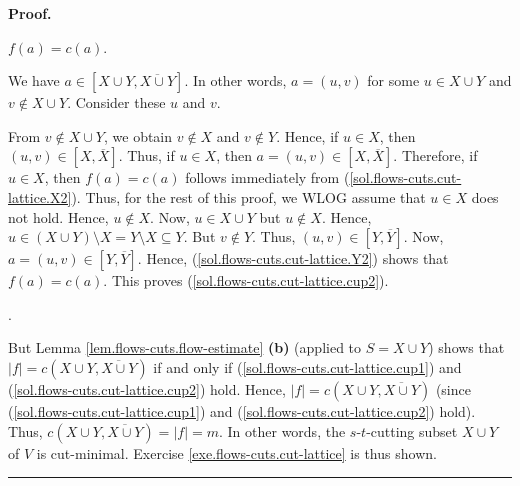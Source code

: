 \documentclass[numbers=enddot,12pt,final,onecolumn,notitlepage]{scrartcl}%
\theoremstyle{definition}
\newenvironment{proof}[1][Proof]{\noindent\textbf{#1.} }{\ \rule{0.5em}{0.5em}}
\begin{document}
\begin{proof}
{$f\left(  a\right)  =c\left(  a\right)  $.
\par
We have $a\in\left[  X\cup Y,\overline{X\cup Y}\right]  $. In other words,
$a=\left(  u,v\right)  $ for some $u\in X\cup Y$ and $v\notin X\cup Y$.
Consider these $u$ and $v$.
\par
From $v\notin X\cup Y$, we obtain $v\notin X$ and $v\notin Y$. Hence, if $u\in
X$, then $\left(  u,v\right)  \in\left[  X,\overline{X}\right]  $. Thus, if
$u\in X$, then $a=\left(  u,v\right)  \in\left[  X,\overline{X}\right]  $.
Therefore, if $u\in X$, then $f\left(  a\right)  =c\left(  a\right)  $ follows
immediately from (\ref{sol.flows-cuts.cut-lattice.X2}). Thus, for the rest of
this proof, we WLOG assume that $u\in X$ does not hold. Hence, $u\notin X$.
Now, $u\in X\cup Y$ but $u\notin X$. Hence, $u\in\left(  X\cup Y\right)
\setminus X=Y\setminus X\subseteq Y$. But $v\notin Y$. Thus, $\left(
u,v\right)  \in\left[  Y,\overline{Y}\right]  $. Now, $a=\left(  u,v\right)
\in\left[  Y,\overline{Y}\right]  $. Hence,
(\ref{sol.flows-cuts.cut-lattice.Y2}) shows that $f\left(  a\right)  =c\left(
a\right)  $. This proves (\ref{sol.flows-cuts.cut-lattice.cup2}).}.

But Lemma \ref{lem.flows-cuts.flow-estimate} \textbf{(b)} (applied to $S=X\cup
Y$) shows that $\left\vert f\right\vert =c\left(  X\cup Y,\overline{X\cup
Y}\right)  $ if and only if (\ref{sol.flows-cuts.cut-lattice.cup1}) and
(\ref{sol.flows-cuts.cut-lattice.cup2}) hold. Hence, $\left\vert f\right\vert
=c\left(  X\cup Y,\overline{X\cup Y}\right)  $ (since
(\ref{sol.flows-cuts.cut-lattice.cup1}) and
(\ref{sol.flows-cuts.cut-lattice.cup2}) hold). Thus, $c\left(  X\cup
Y,\overline{X\cup Y}\right)  =\left\vert f\right\vert =m$. In other words, the
$s$-$t$-cutting subset $X\cup Y$ of $V$ is cut-minimal. Exercise
\ref{exe.flows-cuts.cut-lattice} is thus shown.
\end{proof}
\end{document}
